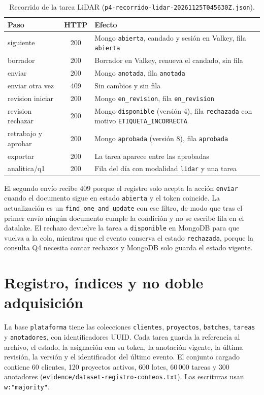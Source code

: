 \documentclass[conference]{IEEEtran}
\begin{document}
\begin{table}[!t]
\caption{Recorrido de la tarea LiDAR (\texttt{p4-recorrido-lidar-20261125T045630Z.json}).}
\label{tab:recorrido}
\centering\footnotesize
\begin{tabularx}{\columnwidth}{@{}p{2.1cm} c X@{}}
\toprule
\textbf{Paso} & \textbf{HTTP} & \textbf{Efecto} \\
\midrule
siguiente & 200 & Mongo \texttt{abierta}, candado y sesión en Valkey, fila \texttt{abierta} \\
borrador & 200 & Borrador en Valkey, renueva el candado, sin fila \\
enviar & 200 & Mongo \texttt{anotada}, fila \texttt{anotada} \\
enviar otra vez & 409 & Sin cambios y sin fila \\
revision iniciar & 200 & Mongo \texttt{en\_revision}, fila \texttt{en\_revision} \\
revision rechazar & 200 & Mongo \texttt{disponible} (versión 4), fila \texttt{rechazada} con motivo \texttt{ETIQUETA\_INCORRECTA} \\
retrabajo y aprobar & 200 & Mongo \texttt{aprobada} (versión 8), fila \texttt{aprobada} \\
exportar & 200 & La tarea aparece entre las aprobadas \\
analitica/q1 & 200 & Fila del día con modalidad \texttt{lidar} y una tarea \\
\bottomrule
\end{tabularx}
\end{table}

El segundo envío recibe 409 porque el registro solo acepta la acción \texttt{enviar} cuando el documento sigue en estado \texttt{abierta} y el token coincide. La actualización es un \texttt{find\_one\_and\_update} con ese filtro, de modo que tras el primer envío ningún documento cumple la condición y no se escribe fila en el datalake. El rechazo devuelve la tarea a \texttt{disponible} en MongoDB para que vuelva a la cola, mientras que el evento conserva el estado \texttt{rechazada}, porque la consulta Q4 necesita contar rechazos y MongoDB solo guarda el estado vigente.

\section{Registro, índices y no doble adquisición}

La base \texttt{plataforma} tiene las colecciones \texttt{clientes}, \texttt{proyectos}, \texttt{batches}, \texttt{tareas} y \texttt{anotadores}, con identificadores UUID. Cada tarea guarda la referencia al archivo, el estado, la asignación con su token, la anotación vigente, la última revisión, la versión y el identificador del último evento. El conjunto cargado contiene 60 clientes, 120 proyectos activos, 600 lotes, 60\,000 tareas y 300 anotadores (\texttt{evidence/dataset-registro-conteos.txt}). Las escrituras usan \texttt{w:"majority"}.
\end{document}
